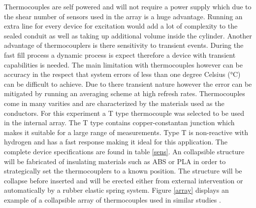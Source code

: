 \documentclass[paper=a4, fontsize=11pt, abstract=on]{scrartcl}
\numberwithin{equation}{section}		%
\numberwithin{figure}{section}			%
\numberwithin{table}{section}				%
\begin{document}
 Thermocouples are self powered and will not require a power supply which due to the shear number of sensors used in the array is a huge advantage. Running an extra line for every device for excitation would add a lot of complexity to the sealed conduit as well as taking up additional volume inside the cylinder. Another advantage of thermocouplers is there sensitivity to transient events. During the fast fill process a dynamic process is expect therefore a device with transient capabilities is needed. The main limitation with thermocouples however can be accuracy in the respect that system errors of less than one degree Celsius (°C) can be difficult to achieve. Due to there transient nature however the error can be mitigated by running an averaging scheme at high refresh rates. Thermocouples come in many varities and are characterized by the materials used as the conductors. For this experiment a T type thermocouple was selected to be used in the internal array. The T type contains copper-constantan junction which makes it suitable for a large range of measurements. Type T is non-reactive with hydrogen and has a fast response making it ideal for this application. The complete device specifications are found in table \ref{sens}. An collapsible structure will be fabricated of insulating materials such as ABS or PLA in order to strategically set the thermocouplers to a known position. The structure will be collapse before inserted and will be erected either from external intervention or automatically by a rubber elastic spring system. Figure \ref{array} displays an example of a collapsible array of thermocouples used in similar studies \cite{dick}.
 
\end{document}
